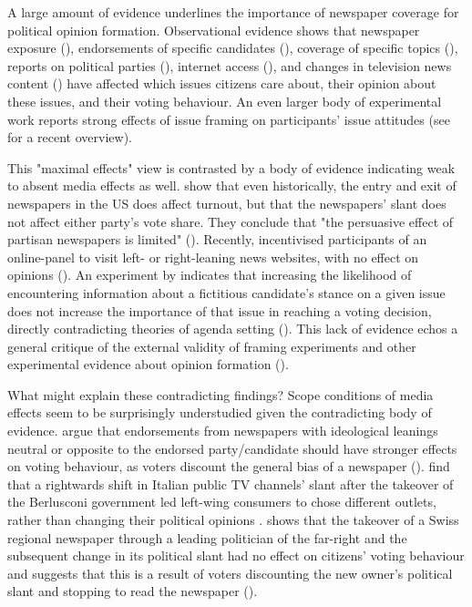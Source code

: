 \documentclass{article}
\begin{document}
A large amount of evidence underlines the importance of newspaper coverage for political opinion formation. Observational evidence shows that newspaper exposure (\cite{Foos2020, Spirig2020}), endorsements of specific candidates (\cite{Ladd2009a, Chiang2011a}), coverage of specific topics (\cite{King2017}), reports on political parties (\cite{Boomgaarden2009, Devine2020}), internet access (\cite{Schaub2020}), and changes in television news content (\cite{Durante2012}) have affected which issues citizens care about, their opinion about these issues, and their voting behaviour. An even larger body of experimental work reports strong effects of issue framing on participants' issue attitudes (see \cite{Busby2019} for a recent overview).

This "maximal effects" view is contrasted by a body of evidence indicating weak to absent media effects as well. \citeauthor{Gentzkow2011} show that even historically, the entry and exit of newspapers in the US does affect turnout, but that the newspapers' slant does not affect either party's vote share. They conclude that "the persuasive effect of partisan newspapers is limited" (\citeyear[3011]{Gentzkow2011}). Recently, \citeauthor{Guess2021} incentivised participants of an online-panel to visit left- or right-leaning news websites, with no effect on opinions (\citeyear{Guess2021}). An experiment by \citeauthor{Lau2021} indicates that increasing the likelihood of encountering information about a fictitious candidate's stance on a given issue does not increase the importance of that issue in reaching a voting decision, directly contradicting theories of agenda setting (\citeyear{Lau2021}). This lack of evidence echos a general critique of the external validity of framing experiments and other experimental evidence about opinion formation (\cite{Barabas2010, Busby2019, Leeper2020}).

What might explain these contradicting findings? Scope conditions of media effects seem to be surprisingly understudied given the contradicting body of evidence. \citeauthor{Chiang2011a} argue that endorsements from newspapers with ideological leanings neutral or opposite to the endorsed party/candidate should have stronger effects on voting behaviour, as voters discount the general bias of a newspaper (\citeyear{Chiang2011a}). \citeauthor{Durante2012} find that a rightwards shift in Italian public TV channels' slant after the takeover of the Berlusconi government led left-wing consumers to chose different outlets, rather than changing their political opinions  \citeyear{Durante2012}. \citeauthor{Spirig2020} shows that the takeover of a Swiss regional newspaper through a leading politician of the far-right and the subsequent change in its political slant had no effect on citizens' voting behaviour and suggests that this is a result of voters discounting the new owner's political slant and stopping to read the newspaper (\citeyear{Spirig2020}).
\end{document}

